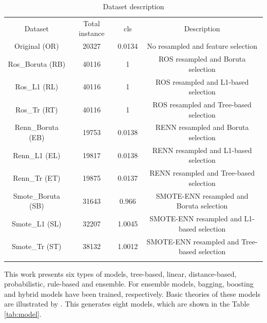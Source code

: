 \begin{table}[h]
\caption{Dataset description}
\label{tab:dataset}       %
\begin{tabular}{cccc}
\hline\noalign{\smallskip}
Dataset & Total instance & cls & Description \\
\noalign{\smallskip}\hline\noalign{\smallskip}
Original (OR) & 20327 & 0.0134 & No resampled and feature selection \\
Ros\_Boruta (RB) & 40116 & 1 & ROS resampled and Boruta selection\\
Ros\_L1 (RL) & 40116 & 1 & ROS resampled and L1-based selection\\
Ros\_Tr (RT) & 40116 & 1 & ROS resampled and Tree-based selection\\
Renn\_Boruta (EB) & 19753 & 0.0138 & RENN resampled and Boruta selection\\
Renn\_L1 (EL) & 19817 & 0.0138 & RENN resampled and L1-based selection\\
Renn\_Tr (ET) & 19875 & 0.0137 & RENN resampled and Tree-based selection\\
Smote\_Boruta (SB) & 31643 & 0.966 & SMOTE-ENN resampled and Boruta selection\\
Smote\_L1 (SL) & 32207 & 1.0045 & SMOTE-ENN resampled and L1-based selection\\
Smote\_Tr (ST) & 38132 & 1.0012 & SMOTE-ENN resampled and Tree-based selection\\
\noalign{\smallskip}\hline
\end{tabular}
\end{table}

This work presents six types of models, tree-based, linear, distance-based, probabilistic, rule-based and ensemble. For ensemble models, bagging, boosting and hybrid models have been trained, respectively. Basic theories of these models are illustrated by \citep{Peter}. This generates eight models, which are shown in the Table \ref{tab:model}.

